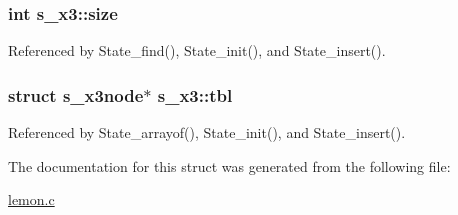 \hypertarget{structs__x3_af02ce4fa00cf802a36e08ef94bd9e3e7}{
\subsubsection[{size}]{\setlength{\rightskip}{0pt plus 5cm}int s\-\_\-x3\-::size}}\label{structs__x3_af02ce4fa00cf802a36e08ef94bd9e3e7}


Referenced by State\-\_\-find(), State\-\_\-init(), and State\-\_\-insert().

\hypertarget{structs__x3_a6988945c2b9d596fa41ce10a3f3e1b59}{
\subsubsection[{tbl}]{\setlength{\rightskip}{0pt plus 5cm}struct {\bf s\-\_\-x3node}$\ast$ s\-\_\-x3\-::tbl}}\label{structs__x3_a6988945c2b9d596fa41ce10a3f3e1b59}


Referenced by State\-\_\-arrayof(), State\-\_\-init(), and State\-\_\-insert().



The documentation for this struct was generated from the following file\-:\begin{DoxyCompactItemize}
\item 
\hyperlink{lemon_8c}{lemon.\-c}\end{DoxyCompactItemize}
